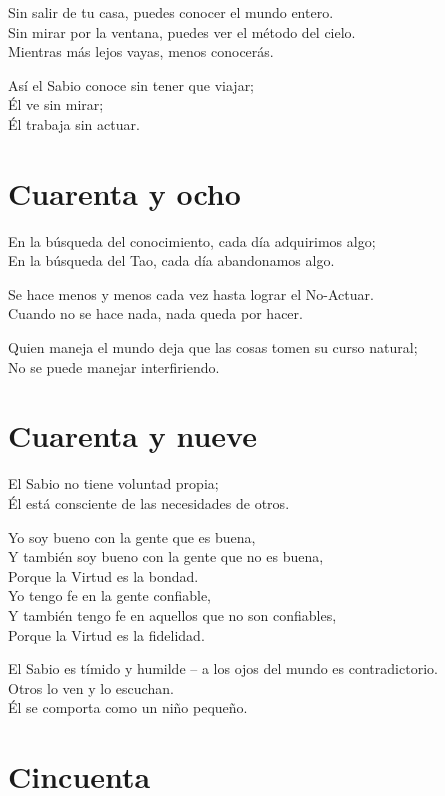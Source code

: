 \documentclass[book,b5paper,hidelinks,final]{memoir}
\begin{document}
	Sin salir de tu casa, puedes conocer el mundo entero.\\
	Sin mirar por la ventana, puedes ver el método del cielo.\\
	Mientras más lejos vayas, menos conocerás.
	
	Así el Sabio conoce sin tener que viajar;\\
	Él ve sin mirar;\\
	Él trabaja sin actuar.
	
	\chapter*{Cuarenta y ocho}
	
	En la búsqueda del conocimiento, cada día adquirimos algo;\\
	En la búsqueda del Tao, cada día abandonamos algo.
	
	Se hace menos y menos cada vez hasta lograr el No-Actuar.\\
	Cuando no se hace nada, nada queda por hacer.
	
	Quien maneja el mundo deja que las cosas tomen su curso natural;\\
	No se puede manejar interfiriendo.
	
	\chapter*{Cuarenta y nueve}
	
	El Sabio no tiene voluntad propia;\\
	Él está consciente de las necesidades de otros.
	
	Yo soy bueno con la gente que es buena,\\
	Y también soy bueno con la gente que no es buena,\\
	Porque la Virtud es la bondad.\\
	Yo tengo fe en la gente confiable,\\
	Y también tengo fe en aquellos que no son confiables,\\
	Porque la Virtud es la fidelidad.
	
	El Sabio es tímido y humilde -- a los ojos del mundo es
	contradictorio.\\
	Otros lo ven y lo escuchan.\\
	Él se comporta como un niño pequeño.
	
	\chapter*{Cincuenta}
	
\end{document}

